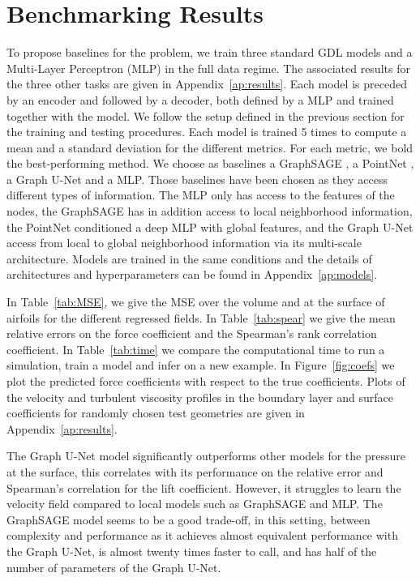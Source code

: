 \section{Benchmarking Results}\label{sec:results}
To propose baselines for the problem, we train three standard GDL models and a Multi-Layer Perceptron (MLP) in the full data regime. The associated results for the three other tasks are given in Appendix~\ref{ap:results}. Each model is preceded by an encoder and followed by a decoder, both defined by a MLP and trained together with the model. We follow the setup defined in the previous section for the training and testing procedures. Each model is trained 5 times to compute a mean and a standard deviation for the different metrics. For each metric, we bold the best-performing method. We choose as baselines a GraphSAGE \cite{gsage}, a PointNet \cite{qi2016pointnet}, a Graph U-Net \cite{gunet} and a MLP. Those baselines have been chosen as they access different types of information. The MLP only has access to the features of the nodes, the GraphSAGE has in addition access to local neighborhood information, the PointNet conditioned a deep MLP with global features, and the Graph U-Net access from local to global neighborhood information via its multi-scale architecture. Models are trained in the same conditions and the details of architectures and hyperparameters can be found in Appendix~\ref{ap:models}.

In Table~\ref{tab:MSE}, we give the MSE over the volume and at the surface of airfoils for the different regressed fields. In Table~\ref{tab:spear} we give the mean relative errors on the force coefficient and the Spearman's rank correlation coefficient. In Table~\ref{tab:time} we compare the computational time to run a simulation, train a model and infer on a new example. In Figure~\ref{fig:coefs} we plot the predicted force coefficients with respect to the true coefficients. Plots of the velocity and turbulent viscosity profiles in the boundary layer and surface coefficients for randomly chosen test geometries are given in Appendix~\ref{ap:results}. 

The Graph U-Net model significantly outperforms other models for the pressure at the surface, this correlates with its performance on the relative error and Spearman's correlation for the lift coefficient. However, it struggles to learn the velocity field compared to local models such as GraphSAGE and MLP. The GraphSAGE model seems to be a good trade-off, in this setting, between complexity and performance as it achieves almost equivalent performance with the Graph U-Net, is almost twenty times faster to call, and has half of the number of parameters of the Graph U-Net.

